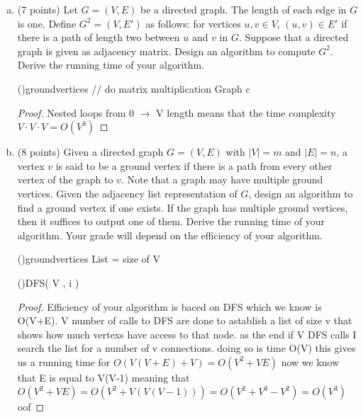 \documentclass[12pt]{amsart}
\begin{document}
\begin{enumerate}[(a)]
\item (7 points)
Let $G= (V,E)$ be a directed graph.
The length of each edge in $G$ is one.
Define $G^{2} = (V,E')$ as follows: for vertices $u,v \in V$,
$(u,v) \in E'$ if there is a path of length two between $u$ and $v$ in $G$.
Suppose that a directed graph is given as adjacency matrix.
Design an algorithm to compute $G^2$.
Derive the running time of your algorithm. 

\begin{algorithm}[H]
\Fn(){groundvertices}{
\SetAlgoLined
\SetNoFillComment
{}
// do matrix multiplication \;
Graph c\;
}
\end{algorithm}
\begin{proof}
Nested loops from 0 $\rightarrow$ V length means that the time complexity $V\cdot V \cdot V = O(V^3)$

\end{proof}

\newpage

\item(8 points)
Given a directed graph $G = (V, E)$ with $|V| = m$ and $|E| = n$, a vertex $v$ is said to be a ground vertex if there is a path from every other vertex of the graph to $v$.
Note that a graph may have multiple ground vertices.  
Given the adjacency list representation of $G$, design an algorithm to find a ground vertex if one exists. 
If the graph has multiple ground vertices, then it suffices to output one of them.
Derive the running time of your algorithm.
Your grade will depend on the efficiency of your algorithm. 

\begin{algorithm}[H]
\Fn(){groundvertices}{
\SetAlgoLined
\SetNoFillComment
{}
List  = size of V\;
}
\end{algorithm}
\begin{algorithm}[H]
\Fn(){DFS( V , i )}{
\SetAlgoLined
\SetNoFillComment
{}
	\;
}
\end{algorithm}

\begin{proof}
Efficiency of your algorithm is baced on DFS which we know is O(V+E). V number of calls to DFS are done to astablish a list of size v that shows how much vertexs have access to that node. as the end if V DFS calls I search the list for a number of v connections. doing so is time O(V) this gives us a running time for $O(V(V+E) + V) = O(V^2+VE)$ now we know that E is equal to V(V-1) meaning that $O(V^2+VE) = O(V^2+V(V(V-1)))=O(V^2+V^3-V^2) = O(V^3) $ oof
\end{proof}

\end{enumerate}
\end{document}
